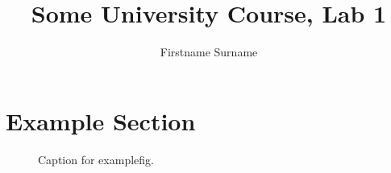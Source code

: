 \documentclass[12pt,a4paper]{article}
\begin{document}
\title{Some University Course, Lab 1}
\author{Firstname Surname}


\newpage
\tableofcontents
\newpage

\section{Example Section}

\begin{figure}
  \begin{small}
  \centering
  
  \caption{
    Caption for examplefig.
  }
  \label{fig:examplefig}
  \end{small}
\end{figure}
\end{document}
